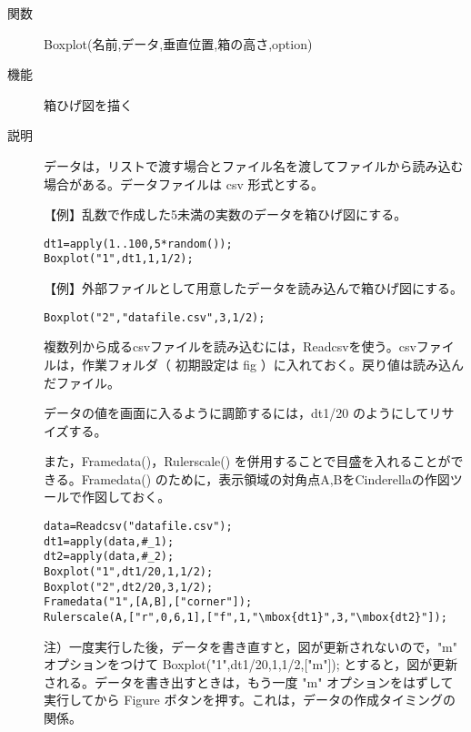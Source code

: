 \documentclass[papersize,a4paper,10pt,uplatex]{jsarticle}
\begin{document}
\begin{description}

\hypertarget{boxplot}{}
\item[関数]Boxplot(名前,データ,垂直位置,箱の高さ,option)
\item[機能]箱ひげ図を描く
\item[説明]データは，リストで渡す場合とファイル名を渡してファイルから読み込む場合がある。データファイルは csv 形式とする。

\vspace{\baselineskip}
【例】乱数で作成した5未満の実数のデータを箱ひげ図にする。

\begin{verbatim}
dt1=apply(1..100,5*random());
Boxplot("1",dt1,1,1/2);
\end{verbatim}
\vspace{\baselineskip}
\hspace{20mm} 

\vspace{\baselineskip}
【例】外部ファイルとして用意したデータを読み込んで箱ひげ図にする。
\begin{verbatim}
Boxplot("2","datafile.csv",3,1/2);
\end{verbatim}

\vspace{\baselineskip}
複数列から成るcsvファイルを読み込むには，Readcsvを使う。csvファイルは，作業フォルダ（ 初期設定は fig ）に入れておく。戻り値は読み込んだファイル。

データの値を画面に入るように調節するには，dt1/20 のようにしてリサイズする。
 
また，Framedata()，Rulerscale() を併用することで目盛を入れることができる。Framedata() のために，表示領域の対角点A,BをCinderellaの作図ツールで作図しておく。

\begin{verbatim}
data=Readcsv("datafile.csv");
dt1=apply(data,#_1);
dt2=apply(data,#_2);
Boxplot("1",dt1/20,1,1/2);
Boxplot("2",dt2/20,3,1/2);
Framedata("1",[A,B],["corner"]);
Rulerscale(A,["r",0,6,1],["f",1,"\mbox{dt1}",3,"\mbox{dt2}"]);
\end{verbatim}
 \begin{center}  \end{center}

注）一度実行した後，データを書き直すと，図が更新されないので，"m" オプションをつけて
Boxplot("1",dt1/20,1,1/2,["m"]); とすると，図が更新される。データを書き出すときは，もう一度 "m" オプションをはずして実行してから Figure ボタンを押す。これは，データの作成タイミングの関係。


\end{description}
\end{document}
